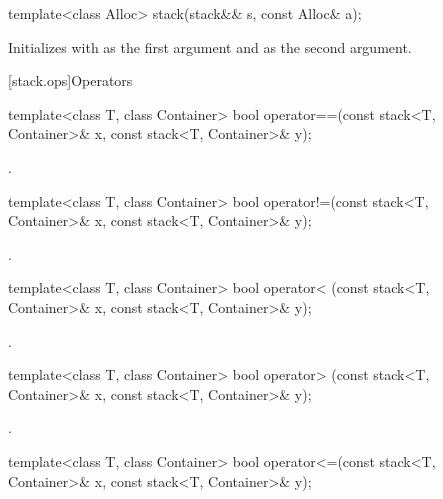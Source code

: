 %
\begin{itemdecl}
template<class Alloc> stack(stack&& s, const Alloc& a);
\end{itemdecl}

\begin{itemdescr}
\pnum
\effects
Initializes  with  as the first argument and 
as the second argument.
\end{itemdescr}

[stack.ops]{Operators}

%
\begin{itemdecl}
template<class T, class Container>
  bool operator==(const stack<T, Container>& x, const stack<T, Container>& y);
\end{itemdecl}

\begin{itemdescr}
\pnum
\returns
{}.
\end{itemdescr}

%
\begin{itemdecl}
template<class T, class Container>
  bool operator!=(const stack<T, Container>& x, const stack<T, Container>& y);
\end{itemdecl}

\begin{itemdescr}
\pnum
\returns
{}.
\end{itemdescr}

%
\begin{itemdecl}
template<class T, class Container>
  bool operator< (const stack<T, Container>& x, const stack<T, Container>& y);
\end{itemdecl}

\begin{itemdescr}
\pnum
\returns
{}.
\end{itemdescr}

%
\begin{itemdecl}
template<class T, class Container>
  bool operator> (const stack<T, Container>& x, const stack<T, Container>& y);
\end{itemdecl}

\begin{itemdescr}
\pnum
\returns
{}.
\end{itemdescr}

%
\begin{itemdecl}
template<class T, class Container>
  bool operator<=(const stack<T, Container>& x, const stack<T, Container>& y);
\end{itemdecl}

